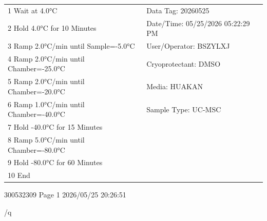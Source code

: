 \documentclass[UTF8,10pt,a4paper,fontset=fandol]{ctexart}
\newcommand{\fieldvalue}[1]{#1}
\newcommand{\handwritten}[1]{#1}
\begin{document}
\begin{flushleft}
\small
\begin{tabularx}{\textwidth}{@{}X@{\hspace{1.5em}}X@{}}
\fieldvalue{1 Wait at 4.0°C}
&
Data Tag: \fieldvalue{20260525}
\\
\fieldvalue{2 Hold 4.0°C for 10 Minutes}
&
Date/Time: \fieldvalue{05/25/2026 05:22:29 PM}
\\
\fieldvalue{3 Ramp 2.0°C/min until Sample=-5.0°C}
&
User/Operator: \fieldvalue{BSZYLXJ}
\\
\fieldvalue{4 Ramp 2.0°C/min until Chamber=-25.0°C}
&
Cryoprotectant: \fieldvalue{DMSO}
\\
\fieldvalue{5 Ramp 2.0°C/min until Chamber=-20.0°C}
&
Media: \fieldvalue{HUAKAN}
\\
\fieldvalue{6 Ramp 1.0°C/min until Chamber=-40.0°C}
&
Sample Type: \fieldvalue{UC-MSC}
\\
\fieldvalue{7 Hold -40.0°C for 15 Minutes}
&
\\
\fieldvalue{8 Ramp 5.0°C/min until Chamber=-80.0°C}
&
\\
\fieldvalue{9 Hold -80.0°C for 60 Minutes}
&
\\
\fieldvalue{10 End}
&
\\
\end{tabularx}

\normalsize

\vfill

\begin{center}
300532309 \hfill Page 1 \hfill 2026/05/25 20:26:51
\end{center}

\handwritten{/q}
\end{flushleft}
\end{document}
